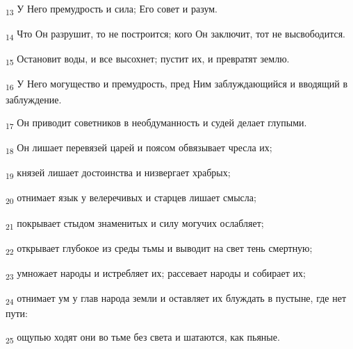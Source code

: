 \begin{tcolorbox}
\textsubscript{13} У Него премудрость и сила; Его совет и разум.
\end{tcolorbox}
\begin{tcolorbox}
\textsubscript{14} Что Он разрушит, то не построится; кого Он заключит, тот не высвободится.
\end{tcolorbox}
\begin{tcolorbox}
\textsubscript{15} Остановит воды, и все высохнет; пустит их, и превратят землю.
\end{tcolorbox}
\begin{tcolorbox}
\textsubscript{16} У Него могущество и премудрость, пред Ним заблуждающийся и вводящий в заблуждение.
\end{tcolorbox}
\begin{tcolorbox}
\textsubscript{17} Он приводит советников в необдуманность и судей делает глупыми.
\end{tcolorbox}
\begin{tcolorbox}
\textsubscript{18} Он лишает перевязей царей и поясом обвязывает чресла их;
\end{tcolorbox}
\begin{tcolorbox}
\textsubscript{19} князей лишает достоинства и низвергает храбрых;
\end{tcolorbox}
\begin{tcolorbox}
\textsubscript{20} отнимает язык у велеречивых и старцев лишает смысла;
\end{tcolorbox}
\begin{tcolorbox}
\textsubscript{21} покрывает стыдом знаменитых и силу могучих ослабляет;
\end{tcolorbox}
\begin{tcolorbox}
\textsubscript{22} открывает глубокое из среды тьмы и выводит на свет тень смертную;
\end{tcolorbox}
\begin{tcolorbox}
\textsubscript{23} умножает народы и истребляет их; рассевает народы и собирает их;
\end{tcolorbox}
\begin{tcolorbox}
\textsubscript{24} отнимает ум у глав народа земли и оставляет их блуждать в пустыне, где нет пути:
\end{tcolorbox}
\begin{tcolorbox}
\textsubscript{25} ощупью ходят они во тьме без света и шатаются, как пьяные.
\end{tcolorbox}
